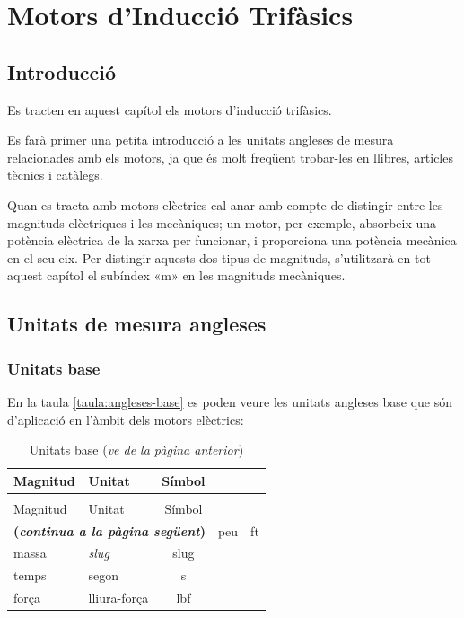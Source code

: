 
\chapter{Motors d'Inducció Trifàsics}\label{sec:ch-motors-ind}

\section{Introducció}

Es tracten en aquest capítol els motors d'inducció trifàsics.

Es farà primer una petita introducció a les unitats angleses de mesura  relacionades amb els motors, ja que és molt freqüent trobar-les en llibres, articles tècnics i catàlegs.

Quan es tracta amb motors elèctrics cal anar amb compte de distingir  entre les magnituds elèctriques i les mecàniques; un motor, per exemple, absorbeix una potència elèctrica de la xarxa per funcionar, i proporciona una potència mecànica en el seu eix. Per distingir aquests dos tipus de magnituds, s'utilitzarà en tot aquest capítol el subíndex «m» en les magnituds mecàniques.

\section{Unitats de mesura angleses}

\subsection{Unitats base}

En la taula \vref{taula:angleses-base} es poden veure les unitats angleses base  que són d'aplicació en l'àmbit dels motors elèctrics:
\begin{longtable}[h]{llc}
   \caption{\label{taula:angleses-base}Unitats angleses base}\\
   \toprule[1pt]
    Magnitud & Unitat & Símbol \\
   \midrule
   \endfirsthead
   \caption[]{Unitats base (\emph{ve de la pàgina anterior})}\\
   \toprule[1pt]
    Magnitud & Unitat & Símbol \\
   \midrule
   \endhead
   \midrule
   \multicolumn{3}{r}{\sffamily\bfseries\color{NavyBlue}(\emph{continua a la pàgina següent})}
   \endfoot
   \endlastfoot
   longitud & peu & ft \\
   massa & \textit{slug} & slug \\
   temps & segon & s\\
   força & lliura-força & lbf \\
   \bottomrule[1pt]
\end{longtable}

